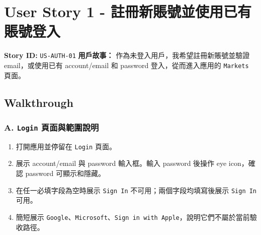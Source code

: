 \section{User Story 1 - 註冊新賬號並使用已有賬號登入}
\textbf{Story ID:} \texttt{US-AUTH-01}
\textbf{用戶故事：} 作為未登入用戶，我希望註冊新賬號並驗證 email，或使用已有 account/\allowbreak{}email 和 password 登入，從而進入應用的 \texttt{Markets} 頁面。
\subsection{Walkthrough}
\subsubsection{A. \texttt{Login} 頁面與範圍說明}
\begin{enumerate}
\item 打開應用並停留在 \texttt{Login} 頁面。
\item 展示 account/\allowbreak{}email 與 password 輸入框。輸入 password 後操作 eye icon，確認 password 可顯示和隱藏。
\item 在任一必填字段為空時展示 \texttt{Sign In} 不可用；兩個字段均填寫後展示 \texttt{Sign In} 可用。
\item 簡短展示 \texttt{Google}、\texttt{Microsoft}、\texttt{Sign in with Apple}，說明它們不屬於當前驗收路徑。
\end{enumerate}
